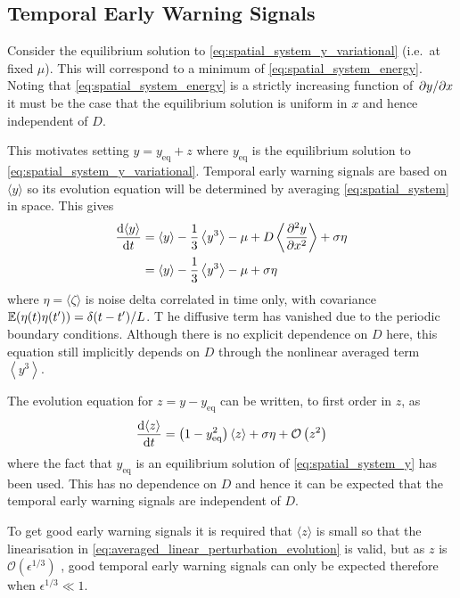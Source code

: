 \subsection{Temporal Early Warning Signals}
Consider the equilibrium solution to \cref{eq:spatial_system_y_variational} (i.e.\ at fixed $\mu$). This will correspond to a minimum
of \cref{eq:spatial_system_energy}. Noting that \cref{eq:spatial_system_energy} is a strictly increasing function of $\pdv*{y}{x}$ it must be the case
that the equilibrium solution is uniform in $x$ and hence independent of $D$.

This motivates setting $y = y_{\mathrm{eq}} + z$ where $y_{\mathrm{eq}}$ is the equilibrium solution to \cref{eq:spatial_system_y_variational}. Temporal
early warning signals are based on $\langle y \rangle$ so its evolution equation will be determined by averaging \cref{eq:spatial_system} in space.
This gives
\begin{align*}
  \dv{\langle y \rangle}{t} &= \langle y \rangle - \frac{1}{3} \left\langle y^3 \right\rangle - \mu + D \left\langle \pdv[2]{y}{x} \right\rangle + \sigma \eta \\
                            &= \langle y \rangle - \frac{1}{3} \left\langle y^3 \right\rangle - \mu + \sigma \eta
\end{align*}
where $\eta = \langle \zeta \rangle$ is noise delta correlated in time only, with covariance $\operatorname*{\mathbb{E}}(\eta(t)\eta(t')) = \delta(t-t')/L$. T
he diffusive term has vanished due to the periodic boundary conditions. Although there is no explicit dependence on $D$ here,
this equation still implicitly depends on $D$ through the nonlinear averaged term $\left\langle y^3 \right\rangle$.

The evolution equation for $z = y - y_{\mathrm{eq}}$  can be written, to first order in $z$, as
\begin{equation}
  \label{eq:averaged_linear_perturbation_evolution}
  \dv{\langle z\rangle}{t} = \left(1 - y_{\mathrm{eq}}^2\right)\left\langle z \right \rangle + \sigma \eta  + \mathcal{O}\left(z^2 \right)
\end{equation}
where the fact that $y_{\mathrm{eq}}$ is an equilibrium solution of \cref{eq:spatial_system_y} has been used. This has no dependence on
$D$ and hence it can be expected that the temporal early warning signals are independent of $D$.

To get good early warning signals it is required that $\langle z\rangle$ is small so that the linearisation in
\cref{eq:averaged_linear_perturbation_evolution} is valid, but as $z$ is $\mathcal{O}\left(\epsilon^{1/3}\right)$ \parencite{Berglund2006},
good temporal early warning signals can only be expected therefore when $\epsilon^{1/3} \ll 1$.

